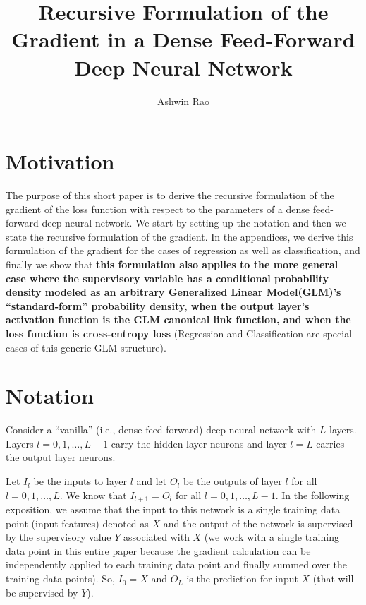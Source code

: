\documentclass[10pt]{amsart}
\title{Recursive Formulation of the Gradient in a Dense Feed-Forward Deep Neural Network}
\author{Ashwin Rao}
\date{} %
\begin{document}
\maketitle

\section{Motivation}
The purpose of this short paper is to derive the recursive formulation of the gradient of the loss function with respect to the parameters of a dense feed-forward deep neural network. We start by setting up the notation and then we state the recursive formulation of the gradient. In the appendices, we derive this formulation of the gradient for the cases of regression as well as classification, and finally we show that {\bf this formulation also applies to the more general case where the supervisory variable has a conditional probability density modeled as an arbitrary Generalized Linear Model(GLM)'s ``standard-form'' probability density, when the output layer's activation function is the GLM canonical link function, and when the loss function is cross-entropy loss} (Regression and Classification are special cases of this generic GLM structure).

\section{Notation}

Consider a ``vanilla'' (i.e., dense feed-forward) deep neural network with $L$ layers. Layers $l = 0, 1, \ldots, L - 1$ carry the hidden layer neurons and layer $l = L$ carries the output layer neurons.

Let $I_l$ be the inputs to layer $l$ and let $O_l$ be the outputs of layer $l$ for all $l = 0, 1, \ldots, L$. We know that $I_{l+1} = O_l$ for all $l = 0, 1, \ldots, L - 1$. In the following exposition, we assume that the input to this network is a single training data point (input features) denoted as $X$ and the output of the network is supervised by the supervisory value $Y$ associated with $X$ (we work with a single training data point in this entire paper because the gradient calculation can be independently applied to each training data point and finally summed over the training data points). So, $I_0 = X$ and $O_L$ is the prediction for input $X$ (that will be supervised by $Y$). 
\end{document}
